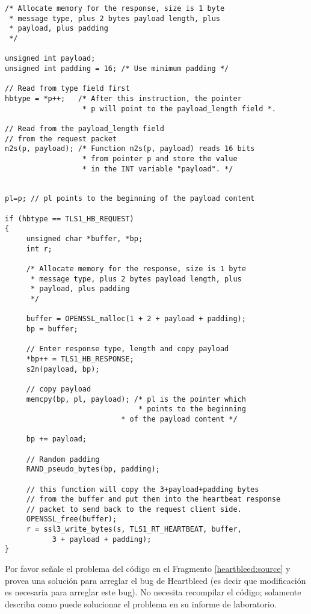 \begin{lstlisting}[caption={Process the Heartbeat request packet and generate the response packet}, 
      label=heartbleed:source]
/* Allocate memory for the response, size is 1 byte
 * message type, plus 2 bytes payload length, plus
 * payload, plus padding
 */

unsigned int payload;
unsigned int padding = 16; /* Use minimum padding */

// Read from type field first  
hbtype = *p++;   /* After this instruction, the pointer
                  * p will point to the payload_length field *.

// Read from the payload_length field 
// from the request packet 
n2s(p, payload); /* Function n2s(p, payload) reads 16 bits
                  * from pointer p and store the value 
                  * in the INT variable "payload". */
			  
			  
pl=p; // pl points to the beginning of the payload content
			  
if (hbtype == TLS1_HB_REQUEST)
{
     unsigned char *buffer, *bp;
     int r;

     /* Allocate memory for the response, size is 1 byte
      * message type, plus 2 bytes payload length, plus
      * payload, plus padding
      */

     buffer = OPENSSL_malloc(1 + 2 + payload + padding);
     bp = buffer;

     // Enter response type, length and copy payload 
     *bp++ = TLS1_HB_RESPONSE;
     s2n(payload, bp);
        
     // copy payload 
     memcpy(bp, pl, payload); /* pl is the pointer which 
                               * points to the beginning 
	                       * of the payload content */

     bp += payload;
			    
     // Random padding
     RAND_pseudo_bytes(bp, padding);			    

     // this function will copy the 3+payload+padding bytes
     // from the buffer and put them into the heartbeat response 
     // packet to send back to the request client side.
     OPENSSL_free(buffer);
     r = ssl3_write_bytes(s, TLS1_RT_HEARTBEAT, buffer,
           3 + payload + padding); 
}
\end{lstlisting}

Por favor señale el problema del código en el Fragmento \ref{heartbleed:source} y  provea una solución para arreglar el bug de Heartbleed (es decir que modificación es necesaria para arreglar este bug). No necesita recompilar el código; solamente describa como puede solucionar el problema en su informe de laboratorio.



